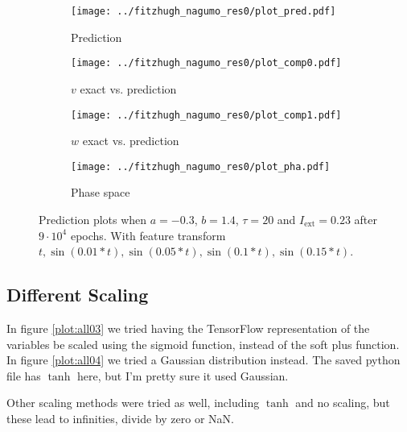\documentclass[a4paper]{article}
\begin{document}
\begin{figure}[H]
	\centering 
	\begin{subfigure}[b]{0.47\textwidth}
		\centering
		\texttt{[image: ../fitzhugh\_nagumo\_res0/plot\_pred.pdf]}
		\caption{Prediction}
		\label{fig:all02a}
	\end{subfigure}
	\begin{subfigure}[b]{0.47\textwidth}
		\centering
		\texttt{[image: ../fitzhugh\_nagumo\_res0/plot\_comp0.pdf]}
		\caption{$v$ exact vs. prediction}
		\label{fig:all02b}
	\end{subfigure}
	\begin{subfigure}[b]{0.47\textwidth}
		\centering
		\texttt{[image: ../fitzhugh\_nagumo\_res0/plot\_comp1.pdf]}
		\caption{$w$ exact vs. prediction}
		\label{fig:all02c}
	\end{subfigure}
	\begin{subfigure}[b]{0.47\textwidth}
		\centering
		\texttt{[image: ../fitzhugh\_nagumo\_res0/plot\_pha.pdf]}
		\caption{Phase space}
		\label{fig:all02d}
	\end{subfigure}
	\caption{Prediction plots when $a=-0.3$, $b=1.4$, $\tau=20$ and $ I_{\text{ext}}=0.23$ after $9\cdot10^4$ epochs. With feature transform $t, \sin(0.01 * t), \sin(0.05 * t), \sin(0.1 * t), \sin(0.15 * t)$.}
	\label{plot:all02}
\end{figure}



\subsection{Different Scaling}

In figure \ref{plot:all03} we tried having the TensorFlow representation of the variables be scaled using the sigmoid function, instead of the soft plus function. In figure \ref{plot:all04} we tried a Gaussian distribution instead. The saved python file has $\tanh$ here, but I'm pretty sure it used Gaussian.

Other scaling methods were tried as well, including $\tanh$ and no scaling, but these lead to infinities, divide by zero or NaN. 
\end{document}
